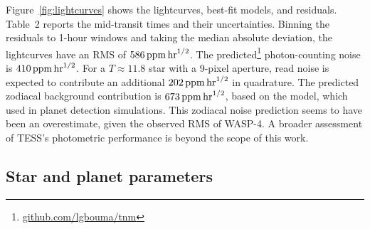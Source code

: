 \documentclass[12pt,twocolumn,tighten]{aastex62}
\begin{document}
Figure~\ref{fig:lightcurves} shows the lightcurves, best-fit models,
and residuals.  Table~2 reports the mid-transit times and their
uncertainties.
Binning the residuals to 1-hour windows and taking the median absolute
deviation, the lightcurves have an RMS of $586\,{\rm ppm}\,{\rm
hr}^{1/2}$.  The predicted\footnote{\url{github.com/lgbouma/tnm}}
photon-counting noise is $410\,{\rm ppm}\,{\rm hr}^{1/2}$.  For a
$T\approx11.8$ star with a 9-pixel aperture, read noise is expected to
contribute an additional $202\,{\rm ppm}\,{\rm hr}^{1/2}$ in
quadrature.  The predicted zodiacal background contribution is
$673\,{\rm ppm}\,{\rm hr}^{1/2}$, based on the
\citet{winn_photonflux_2013} model, which \citet{Sullivan_2015} used
in planet detection simulations.  This zodiacal noise prediction seems
to have been an overestimate, given the observed RMS of WASP-4.  A
broader assessment of TESS's photometric performance is beyond
the scope of this work.


\subsection{Star and planet parameters}
\label{sec:system_parameters}
\end{document}
